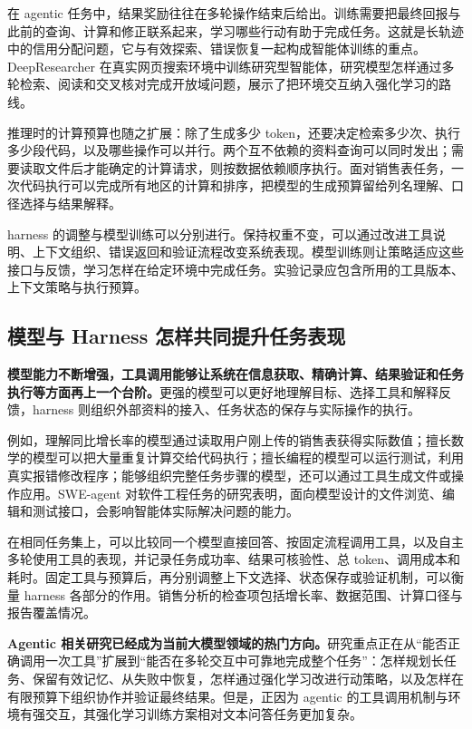 在 agentic 任务中，结果奖励往往在多轮操作结束后给出。训练需要把最终回报与此前的查询、计算和修正联系起来，学习哪些行动有助于完成任务。这就是长轨迹中的信用分配问题，它与有效探索、错误恢复一起构成智能体训练的重点。DeepResearcher 在真实网页搜索环境中训练研究型智能体，研究模型怎样通过多轮检索、阅读和交叉核对完成开放域问题，展示了把环境交互纳入强化学习的路线。

推理时的计算预算也随之扩展：除了生成多少 token，还要决定检索多少次、执行多少段代码，以及哪些操作可以并行。两个互不依赖的资料查询可以同时发出；需要读取文件后才能确定的计算请求，则按数据依赖顺序执行。面对销售表任务，一次代码执行可以完成所有地区的计算和排序，把模型的生成预算留给列名理解、口径选择与结果解释。

harness 的调整与模型训练可以分别进行。保持权重不变，可以通过改进工具说明、上下文组织、错误返回和验证流程改变系统表现。模型训练则让策略适应这些接口与反馈，学习怎样在给定环境中完成任务。实验记录应包含所用的工具版本、上下文策略与执行预算。

\subsection{模型与 Harness 怎样共同提升任务表现}

\textbf{模型能力不断增强，工具调用能够让系统在信息获取、精确计算、结果验证和任务执行等方面再上一个台阶。}更强的模型可以更好地理解目标、选择工具和解释反馈，harness 则组织外部资料的接入、任务状态的保存与实际操作的执行。

例如，理解同比增长率的模型通过读取用户刚上传的销售表获得实际数值；擅长数学的模型可以把大量重复计算交给代码执行；擅长编程的模型可以运行测试，利用真实报错修改程序；能够组织完整任务步骤的模型，还可以通过工具生成文件或操作应用。SWE-agent 对软件工程任务的研究表明，面向模型设计的文件浏览、编辑和测试接口，会影响智能体实际解决问题的能力。

在相同任务集上，可以比较同一个模型直接回答、按固定流程调用工具，以及自主多轮使用工具的表现，并记录任务成功率、结果可核验性、总 token、调用成本和耗时。固定工具与预算后，再分别调整上下文选择、状态保存或验证机制，可以衡量 harness 各部分的作用。销售分析的检查项包括增长率、数据范围、计算口径与报告覆盖情况。

\textbf{Agentic 相关研究已经成为当前大模型领域的热门方向。}研究重点正在从``能否正确调用一次工具''扩展到``能否在多轮交互中可靠地完成整个任务''：怎样规划长任务、保留有效记忆、从失败中恢复，怎样通过强化学习改进行动策略，以及怎样在有限预算下组织协作并验证最终结果。但是，正因为 agentic 的工具调用机制与环境有强交互，其强化学习训练方案相对文本问答任务更加复杂。

